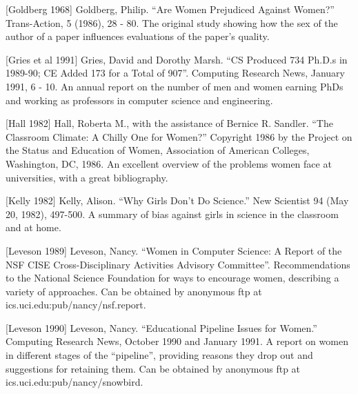 {[Goldberg 1968]     Goldberg, Philip. ``Are Women Prejudiced Against Women?'' Trans-Action,
                    5 (1986), 28 - 80. The original study
                    showing how the sex of the author of a
                    paper influences evaluations of the paper's
                    quality.


[Gries et al 1991]  Gries, David and Dorothy Marsh. ``CS
                    Produced 734 Ph.D.s in 1989-90; CE
                    Added 173 for a Total of 907''. Computing Research News, January 1991, 6
                    - 10. An annual report on the number of
                    men and women earning PhDs and working as professors in computer science and
                    engineering.





[Hall 1982]         Hall, Roberta M., with the assistance
                    of Bernice R. Sandler. ``The Classroom
                    Climate:  A Chilly One for Women?''
                    Copyright 1986 by the Project on the
                    Status and Education of Women, Association of American Colleges, Washington, DC, 1986. An excellent overview of
                    the problems women face at universities,
                    with a great bibliography.




[Kelly 1982]        Kelly, Alison. ``Why Girls Don't Do
                    Science.'' New Scientist 94 (May 20,
                    1982),  497-500.  A  summary  of  bias
                    against girls in science in the classroom
                    and at home.



[Leveson 1989]      Leveson, Nancy. ``Women in Computer
                    Science:  A Report of the NSF CISE
                    Cross-Disciplinary Activities Advisory
                    Committee''. Recommendations to the National
                    Science Foundation for ways to encourage women, describing a variety of approaches. Can be obtained by anonymous
                    ftp at ics.uci.edu:pub/nancy/nsf.report.


[Leveson 1990]      Leveson, Nancy. ``Educational Pipeline
                    Issues  for  Women.''  Computing  Research News, October 1990 and January 1991. A report on women in different
                    stages of the ``pipeline'', providing reasons
                    they drop out and suggestions for retaining them. Can be obtained by anonymous
                    ftp at ics.uci.edu:pub/nancy/snowbird.


}

